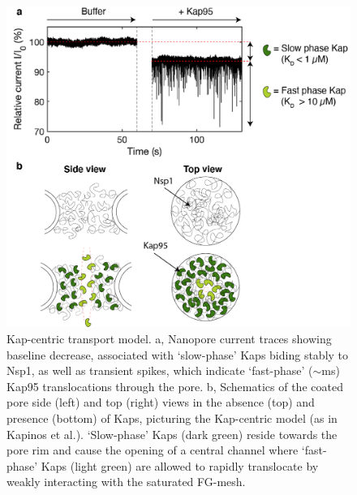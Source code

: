 \begin{figure}[!htbp]
	\centering
	\includegraphics[width=1\linewidth]{figures/Figure7.4.png}
	\caption{Kap-centric transport model. a, Nanopore current traces showing baseline decrease, associated with ‘slow-phase’ Kaps biding stably to Nsp1, as well as transient spikes, which indicate ‘fast-phase’ ($\sim$ms) Kap95 translocations through the pore. b, Schematics of the coated pore side (left) and top (right) views in the absence (top) and presence (bottom) of Kaps, picturing the Kap-centric model (as in Kapinos et al.\cite{Kapinos2014}). ‘Slow-phase’ Kaps (dark green) reside towards the pore rim and cause the opening of a central channel where ‘fast-phase’ Kaps (light green) are allowed to rapidly translocate by weakly interacting with the saturated FG-mesh.}
	\label{fig:fig7.4}
\end{figure}


